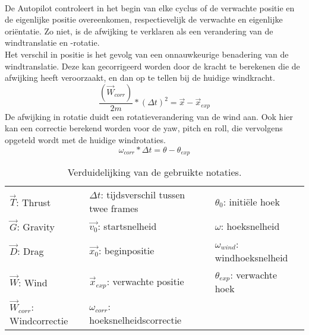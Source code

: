 \\
De Autopilot controleert in het begin van elke cyclus of de verwachte positie en de eigenlijke positie overeenkomen, respectievelijk de verwachte en eigenlijke ori\"entatie. Zo niet, is de afwijking te verklaren als een verandering van de windtranslatie en -rotatie. 
\\
Het verschil in positie is het gevolg van een onnauwkeurige benadering van de windtranslatie. Deze kan gecorrigeerd worden door de kracht te berekenen die de afwijking heeft veroorzaakt, en dan op te tellen bij de huidige windkracht.
\begin{equation}
	\frac{(\vec{W}_{corr}) }{2m} * (\Delta t)^2 = \vec{x}-\vec{x}_{exp}
\end{equation}
De afwijking in rotatie duidt een rotatieverandering van de wind aan. Ook hier kan een correctie berekend worden voor de yaw, pitch en roll, die vervolgens opgeteld wordt met de huidige windrotaties.
\begin{equation}
	\omega_{corr}*\Delta t = \theta-\theta_{exp}
\end{equation}
\begin{table}[h]
	\centering
	\begin{tabular}{ l|l|l }
		\(\vec{T}\): Thrust & \(\Delta t\): tijdsverschil tussen twee frames & \(\theta_0\): initi\"ele hoek \\
		\(\vec{G}\): Gravity & \(\vec{v_0}\): startsnelheid & \(\omega\): hoeksnelheid\\
		\(\vec{D}\): Drag & \(\vec{x_0}\): beginpositie&\(\omega_{wind}\): windhoeksnelheid\\
		\(\vec{W}\): Wind & \(\vec{x}_{exp}\): verwachte positie&\(\theta_{exp}\): verwachte hoek\\
		\(\vec{W}_{corr}\): Windcorrectie & \(\omega_{corr}\): hoeksnelheidscorrectie &\\
	\end{tabular}
	\caption{\label{table: uitlegFormule}Verduidelijking van de gebruikte notaties.}
\end{table}